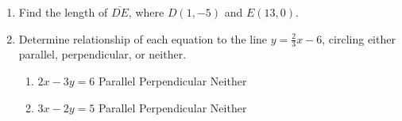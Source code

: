\begin{enumerate}
\begin{enumerate}
\end{enumerate}

\item Find the length of $\overline{DE}$, where $D(1,-5)$ and $E(13,0)$.
       \vspace{4cm}

   \item Determine relationship of each equation to the line  $y=\frac{2}{3} x-6$, circling either parallel, perpendicular, or neither.
     \begin{enumerate}
       \item $2x-3y=6$ \hspace{1cm} Parallel \qquad Perpendicular \qquad Neither
       \vspace{1.5cm}
       \item $3x-2y=5$ \hspace{1cm} Parallel \qquad Perpendicular \qquad Neither
       \vspace{2.cm}
     \end{enumerate}


\end{enumerate}
